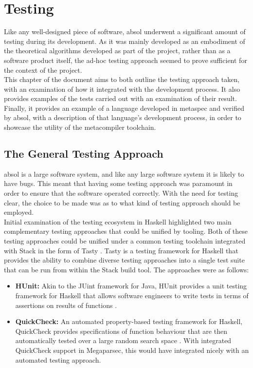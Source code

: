 \chapter{Testing} %
\label{cha:testing}
Like any well-designed piece of software, \gls{absol} underwent a significant amount of testing during its development.
As it was mainly developed as an embodiment of the theoretical algorithms developed as part of the project, rather than as a software product itself, the ad-hoc testing approach seemed to prove sufficient for the context of the project.\\

This chapter of the document aims to both outline the testing approach taken, with an examination of how it integrated with the development process.
It also provides examples of the tests carried out with an examination of their result. 
Finally, it provides an example of a language developed in \gls{metaspec} and verified by \gls{absol}, with a description of that language's development process, in order to showcase the utility of the metacompiler toolchain.

\section{The General Testing Approach} %
\label{sec:the_general_testing_approach}
\gls{absol} is a large software system, and like any large software system it is likely to have bugs.
This meant that having some testing approach was paramount in order to ensure that the software operated correctly.
With the need for testing clear, the choice to be made was as to what kind of testing approach should be employed.\\

Initial examination of the testing ecosystem in Haskell highlighted two main complementary testing approaches that could be unified by tooling.
Both of these testing approaches could be unified under a common testing toolchain integrated with Stack in the form of Tasty \citep{tasty_haskell}. 
Tasty is a testing framework for Haskell that provides the ability to combine diverse testing approaches into a single test suite that can be run from within the Stack build tool. 
The approaches were as follows:
\begin{itemize}
    \item \textbf{HUnit:} Akin to the JUint framework for Java, HUnit provides a unit testing framework for Haskell that allows software engineers to write tests in terms of assertions on results of functions \citep{hunit}.
    \item \textbf{QuickCheck:} An automated property-based testing framework for Haskell, QuickCheck provides specifications of function behaviour that are then automatically tested over a large random search space \citep{quick_check}.
    With integrated QuickCheck support in Megaparsec, this would have integrated nicely with an automated testing approach.
\end{itemize}

